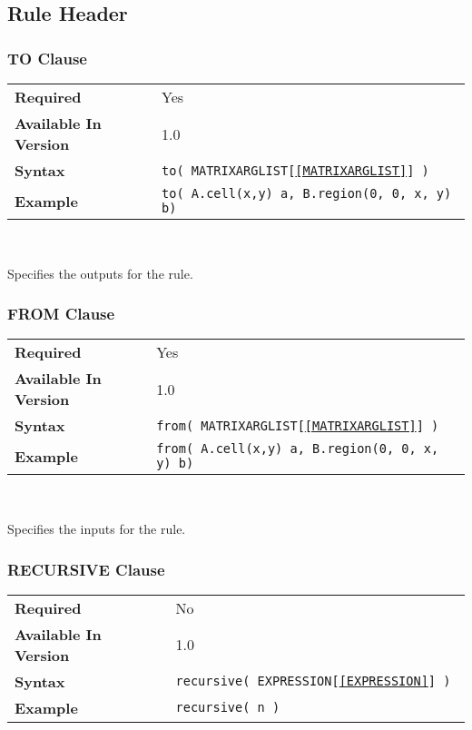 \documentclass[11pt]{article}
\begin{document}
\subsection{Rule Header}
\label{sec:rule}

\subsubsection{TO Clause}
\label{TO}
\begin{tabular}{| l | l |}
\hline
\bf Required & Yes                          \\
\bf Available In Version & 1.0             \\
\bf Syntax & \tt to( MATRIXARGLIST[\ref{MATRIXARGLIST}] ) \\
\bf Example & \tt to( A.cell(x,y) a, B.region(0, 0, x, y) b)\\
\hline
\end{tabular}

~

\noindent Specifies the outputs for the rule.

\subsubsection{FROM Clause}
\label{FROM}
\begin{tabular}{| l | l |}
\hline
\bf Required & Yes                          \\
\bf Available In Version & 1.0             \\
\bf Syntax & \tt from( MATRIXARGLIST[\ref{MATRIXARGLIST}] ) \\
\bf Example & \tt from( A.cell(x,y) a, B.region(0, 0, x, y) b)\\
\hline
\end{tabular}

~

\noindent Specifies the inputs for the rule.

\subsubsection{RECURSIVE Clause}
\begin{tabular}{| l | l |}
\hline
\bf Required & No \\
\bf Available In Version & 1.0             \\
\bf Syntax & \tt recursive( EXPRESSION[\ref{EXPRESSION}] )   \\
\bf Example & \tt recursive( n )           \\
\hline
\end{tabular}
\end{document}
